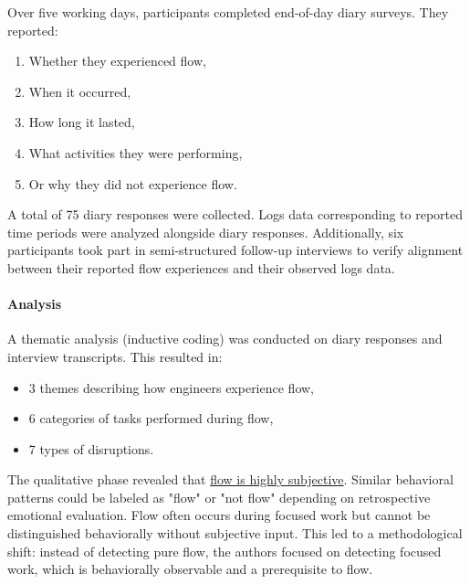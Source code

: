 Over five working days, participants completed end-of-day diary surveys. They reported:
\begin{enumerate}
    \item Whether they experienced flow,
    \item When it occurred,
    \item How long it lasted,
    \item What activities they were performing,
    \item Or why they did not experience flow.
\end{enumerate}

A total of 75 diary responses were collected. Logs data corresponding to reported time periods were analyzed alongside diary responses. Additionally, six participants took part in semi-structured follow-up interviews to verify alignment between their reported flow experiences and their observed logs data.

\paragraph{Analysis}
A thematic analysis (inductive coding) was conducted on diary responses and interview transcripts. This resulted in:
\begin{itemize}
    \item 3 themes describing how engineers experience flow,
    \item 6 categories of tasks performed during flow,
    \item 7 types of disruptions.
\end{itemize}

The qualitative phase revealed that \underline{flow is highly subjective}. Similar behavioral patterns could be labeled as "flow" or "not flow" depending on retrospective emotional evaluation. Flow often occurs during focused work but cannot be distinguished behaviorally without subjective input. This led to a methodological shift: instead of detecting pure flow, the authors focused on detecting focused work, which is behaviorally observable and a prerequisite to flow.

